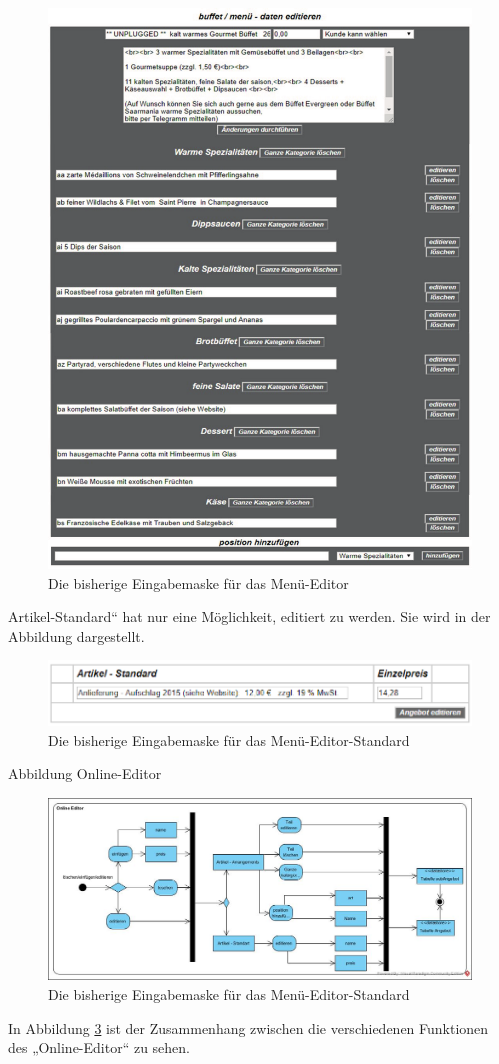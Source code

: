 \pagebreak
\begin{figure}[h]
	\centering
	\includegraphics[width=0.7\linewidth]{Graphics/arrangement-Menue-editor.pdf}
		\caption[Kun2deansicht]{Die bisherige Eingabemaske für das Menü-Editor}
	\label{fig: Editor-Menü2}
\end{figure}


Artikel-Standard“ hat nur eine Möglichkeit, editiert zu werden. Sie wird in der Abbildung   dargestellt.

\begin{figure}[h]
	\centering
	\includegraphics[width=0.7\linewidth]{Graphics/menuStandart.png}
	\caption[Kundeansicht]{Die bisherige Eingabemaske für das Menü-Editor-Standard}
	\label{fig: Editor-Menü-Standard}
\end{figure}



Abbildung Online-Editor
\begin{figure}[h]
	\centering
	\includegraphics[width=1\linewidth]{Graphics/OnlineEdior.jpg}
	\caption[Kundeansicht]{Die bisherige Eingabemaske für das Menü-Editor-Standard}
	\label{fig: Editor-Menü-Funktionalität}
\end{figure}
In Abbildung \ref{fig: Editor-Menü-Funktionalität} ist der Zusammenhang zwischen die verschiedenen Funktionen des „Online-Editor“ zu sehen.

